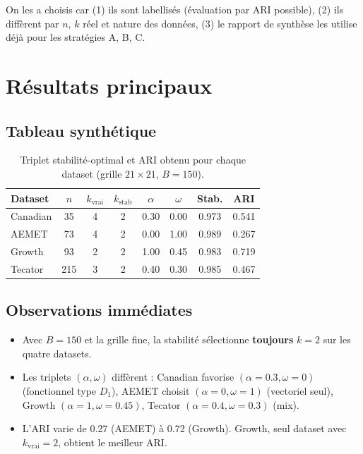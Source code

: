 \documentclass[11pt, a4paper]{article}
\begin{document}
On les a choisis car (1) ils sont labellisés (évaluation par ARI possible),
(2) ils diffèrent par $n$, $k$ réel et nature des données, (3) le rapport de
synthèse les utilise déjà pour les stratégies A, B, C.

\section{Résultats principaux}

\subsection{Tableau synthétique}

\begin{table}[H]
\centering
\renewcommand{\arraystretch}{1.2}
\begin{tabular}{lccccccc}
\toprule
\textbf{Dataset} & $n$ & $k_{\mathrm{vrai}}$ & $k_{\mathrm{stab}}$ &
$\alpha$ & $\omega$ & \textbf{Stab.} & \textbf{ARI} \\
\midrule
Canadian & 35 & 4 & 2 & 0.30 & 0.00 & 0.973 & 0.541 \\
AEMET    & 73 & 4 & 2 & 0.00 & 1.00 & 0.989 & 0.267 \\
Growth   & 93 & 2 & 2 & 1.00 & 0.45 & 0.983 & 0.719 \\
Tecator  & 215 & 3 & 2 & 0.40 & 0.30 & 0.985 & 0.467 \\
\bottomrule
\end{tabular}
\caption{Triplet stabilité-optimal et ARI obtenu pour chaque dataset
(grille $21 \times 21$, $B = 150$).}
\label{tab:resumes}
\end{table}

\subsection{Observations immédiates}

\begin{itemize}
  \item Avec $B = 150$ et la grille fine, la stabilité sélectionne
        \textbf{toujours} $k = 2$ sur les quatre datasets.
  \item Les triplets $(\alpha, \omega)$ diffèrent : Canadian favorise
        $(\alpha=0.3, \omega=0)$ (fonctionnel type $D_1$), AEMET choisit
        $(\alpha=0, \omega=1)$ (vectoriel seul), Growth $(\alpha=1, \omega=0.45)$,
        Tecator $(\alpha=0.4, \omega=0.3)$ (mix).
  \item L'ARI varie de 0.27 (AEMET) à 0.72 (Growth). Growth, seul dataset
        avec $k_{\mathrm{vrai}} = 2$, obtient le meilleur ARI.
\end{itemize}
\end{document}
